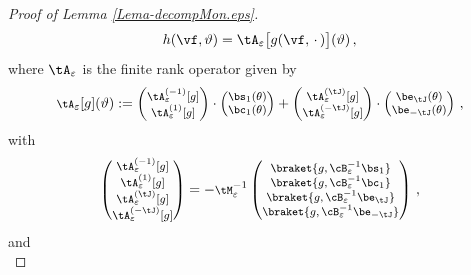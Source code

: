 \documentclass[a4paper,reqno,10pt]{article}
\begin{document}
\begin{proof}[Proof of Lemma \ref{Lema-decompMon.eps}]
	\begin{equation}
	     h(\vf,\vartheta) = \tA_{\varepsilon}\big[g(\vf,\,\cdot\,) \big](\vartheta) \,,
	\end{equation}
    where $\tA_{\varepsilon}$ is the finite rank operator given by
	\begin{equation}\label{tA-eps.FR}
		\begin{footnotesize}
			\tA_{\varepsilon}[g](\vartheta)  := \begin{pmatrix}
			    \tA_{\varepsilon}^{(-1)}[g] \\ \tA_{\varepsilon}^{(1)}[g]
			\end{pmatrix} \cdot \begin{pmatrix}
			   \bs_{1}(\theta) \\  \bc_{1}(\theta)
			\end{pmatrix}     +  \begin{pmatrix}
			    \tA_{\varepsilon}^{(\tJ)}[g] \\ \tA_{\varepsilon}^{(-\tJ)}[g]
			\end{pmatrix}\cdot \begin{pmatrix}
			    \be_{\tJ}(\theta) \\ \be_{-\tJ}(\theta)
			\end{pmatrix}  \,,
		\end{footnotesize}
	\end{equation}
    with
	\begin{equation}\label{tA.def}
		\begin{footnotesize}
			\begin{pmatrix}
				\tA_{\varepsilon}^{(-1)}[g]	 \\
                \tA_{\varepsilon}^{(1)}[g]	 \\
				\tA_{\varepsilon}^{(\tJ)}[g]\\
				\tA_{\varepsilon}^{(-\tJ)}[g]
			\end{pmatrix} = -\tM_{\varepsilon}^{-1} \begin{pmatrix}
            \braket{g,\cB_{\varepsilon}^{-1}\bs_{1}} \\ 
				\braket{g,\cB_{\varepsilon}^{-1}\bc_{1}} \\ 	\braket{g,\cB_{\varepsilon}^{-1}\be_{\tJ}}\\	\braket{g,\cB_{\varepsilon}^{-1}\be_{-\tJ}}
			\end{pmatrix}\,,
		\end{footnotesize}
	\end{equation}
    and
    \begin{equation}\label{matrix.tM}

\end{equation}
\end{proof}
\end{document}
